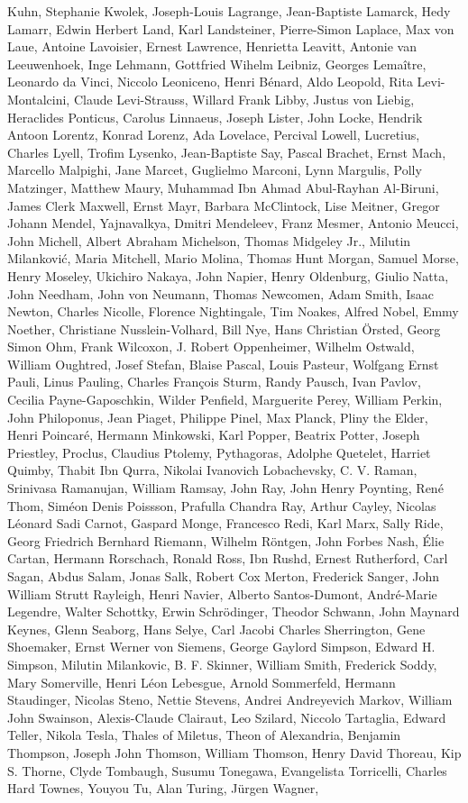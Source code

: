 \begin{spacing}{0.5}
\begin{tiny}
Kuhn, Stephanie Kwolek, Joseph-Louis Lagrange,  Jean-Baptiste Lamarck, Hedy Lamarr, Edwin Herbert Land, Karl Landsteiner, Pierre-Simon Laplace, Max von Laue, Antoine Lavoisier, Ernest Lawrence, Henrietta Leavitt, Antonie van Leeuwenhoek, Inge Lehmann, Gottfried Wihelm Leibniz, Georges Lemaître, Leonardo da Vinci, Niccolo Leoniceno, Henri Bénard, Aldo Leopold, Rita Levi-Montalcini, Claude Levi-Strauss, Willard Frank Libby, Justus von Liebig, Heraclides Ponticus, Carolus Linnaeus, Joseph Lister, John Locke, Hendrik Antoon Lorentz, Konrad Lorenz, Ada Lovelace, Percival Lowell, Lucretius, Charles Lyell, Trofim Lysenko, Jean-Baptiste Say, Pascal Brachet, Ernst Mach, Marcello Malpighi, Jane Marcet, Guglielmo Marconi, Lynn Margulis, Polly Matzinger, Matthew Maury, Muhammad Ibn Ahmad Abul-Rayhan Al-Biruni, James Clerk Maxwell, Ernst Mayr, Barbara McClintock, Lise Meitner, Gregor Johann Mendel, Yajnavalkya, Dmitri Mendeleev, Franz Mesmer, Antonio Meucci, John Michell, Albert Abraham Michelson, Thomas Midgeley Jr., Milutin Milanković, Maria Mitchell, Mario Molina, Thomas Hunt Morgan, Samuel Morse, Henry Moseley, Ukichiro Nakaya, John Napier, Henry Oldenburg, Giulio Natta, John Needham, John von Neumann, Thomas Newcomen, Adam Smith, Isaac Newton, Charles Nicolle, Florence Nightingale, Tim Noakes, Alfred Nobel, Emmy Noether, Christiane Nusslein-Volhard, Bill Nye, Hans Christian Örsted, Georg Simon Ohm, Frank Wilcoxon, J. Robert Oppenheimer, Wilhelm Ostwald, William Oughtred, Josef Stefan, Blaise Pascal, Louis Pasteur, Wolfgang Ernst Pauli, Linus Pauling, Charles François Sturm, Randy Pausch, Ivan Pavlov, Cecilia Payne-Gaposchkin, Wilder Penfield, Marguerite Perey, William Perkin, John Philoponus, Jean Piaget, Philippe Pinel, Max Planck, Pliny the Elder, Henri Poincaré, Hermann Minkowski, Karl Popper, Beatrix Potter, Joseph Priestley, Proclus, Claudius Ptolemy, Pythagoras, Adolphe Quetelet, Harriet Quimby, Thabit Ibn Qurra, Nikolai Ivanovich Lobachevsky, C. V. Raman, Srinivasa Ramanujan, William Ramsay, John Ray, John Henry Poynting, René Thom, Siméon Denis Poissson, Prafulla Chandra Ray, Arthur Cayley, Nicolas Léonard Sadi Carnot, Gaspard Monge, Francesco Redi, Karl Marx, Sally Ride, Georg Friedrich Bernhard Riemann, Wilhelm Röntgen, John Forbes Nash, Élie Cartan, Hermann Rorschach, Ronald Ross, Ibn Rushd, Ernest Rutherford, Carl Sagan, Abdus Salam, Jonas Salk, Robert Cox Merton, Frederick Sanger, John William Strutt Rayleigh,  Henri Navier, Alberto Santos-Dumont, André-Marie Legendre, Walter Schottky, Erwin Schrödinger, Theodor Schwann, John Maynard Keynes, Glenn Seaborg, Hans Selye, Carl Jacobi Charles Sherrington, Gene Shoemaker, Ernst Werner von Siemens, George Gaylord Simpson, Edward H. Simpson, Milutin Milankovic, B. F. Skinner, William Smith, Frederick Soddy, Mary Somerville, Henri Léon Lebesgue, Arnold Sommerfeld, Hermann Staudinger, Nicolas Steno, Nettie Stevens, Andrei Andreyevich Markov, William John Swainson, Alexis-Claude Clairaut, Leo Szilard, Niccolo Tartaglia, Edward Teller, Nikola Tesla, Thales of Miletus, Theon of Alexandria, Benjamin Thompson, Joseph John Thomson, William Thomson, Henry David Thoreau, Kip S. Thorne, Clyde Tombaugh, Susumu Tonegawa, Evangelista Torricelli, Charles Hard Townes, Youyou Tu, Alan Turing, Jürgen Wagner, 
\end{tiny}
\end{spacing}
